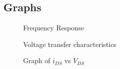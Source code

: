 \documentclass[titlepage]{article}
\begin{document}
\subsection{Graphs}
\begin{figure}[ht]
    \centering
    \caption{Frequency Response}
    \label{fig:fr1}
\end{figure}
\begin{figure}[ht]
    \centering
    \caption{Voltage transfer characteristics}
    \label{fig:vtc}
\end{figure}
\newpage
\begin{figure}[ht]
    \centering
    \caption{Graph of $i_{DS}$ vs $V_{DS}$}
    \label{fig:i_vs_vds}
\end{figure}
\end{document}
